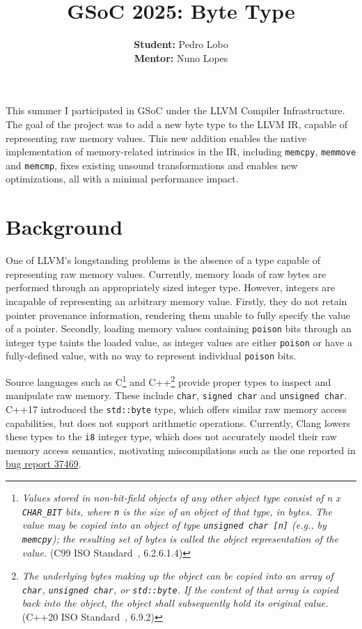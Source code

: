 \documentclass[a4paper,12pt]{article}
\begin{document}
\title{\textbf{GSoC 2025: Byte Type}}
\author{\textbf{Student:} Pedro Lobo\\
        \textbf{Mentor:} Nuno Lopes}
\date{}

\maketitle

This summer I participated in GSoC under the LLVM Compiler Infrastructure.
The goal of the project was to add a new byte type to the LLVM IR, capable of representing raw memory values.
This new addition enables the native implementation of memory-related intrinsics in the IR, including \texttt{memcpy}, \texttt{memmove} and \texttt{memcmp}, fixes existing unsound transformations and enables new optimizations, all with a minimal performance impact.

\section{Background}

One of LLVM's longstanding problems is the absence of a type capable of representing raw memory values.
Currently, memory loads of raw bytes are performed through an appropriately sized integer type.
However, integers are incapable of representing an arbitrary memory value.
Firstly, they do not retain pointer provenance information, rendering them unable to fully specify the value of a pointer.
Secondly, loading memory values containing \texttt{poison} bits through an integer type taints the loaded value, as integer values are either \texttt{poison} or have a fully-defined value, with no way to represent individual \texttt{poison} bits.

Source languages such as C\footnote{\textit{Values stored in non-bit-field objects of any other object type consist of n x \texttt{CHAR\_BIT} bits, where \texttt{n} is the size of an object of that type, in bytes. The value may be copied into an object of type \texttt{unsigned char [n]} (e.g., by \texttt{memcpy}); the resulting set of bytes is called the object representation of the value.} (C99 ISO Standard~\cite{c99}, 6.2.6.1.4)} and C++\footnote{\textit{The underlying bytes making up the object can be copied into an array of \texttt{char}, \texttt{unsigned char}, or \texttt{std::byte}. If the content of that array is copied back into the object, the object shall subsequently hold its original value.} (C++20 ISO Standard~\cite{cpp20}, 6.9.2)} provide proper types to inspect and manipulate raw memory.
These include \texttt{char}, \texttt{signed char} and \texttt{unsigned char}.
C++17 introduced the \texttt{std::byte} type, which offers similar raw memory access capabilities, but does not support arithmetic operations.
Currently, Clang lowers these types to the \texttt{i8} integer type, which does not accurately model their raw memory access semantics, motivating miscompilations such as the one reported in \href{https://bugs.llvm.org/show_bug.cgi?id=37469}{bug report 37469}.
\end{document}
